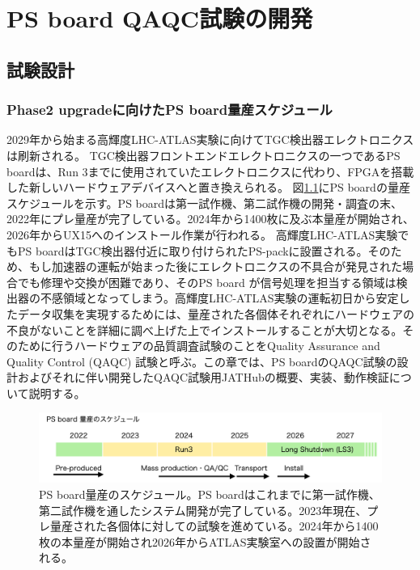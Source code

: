 \chapter{PS board QAQC試験の開発}
\label{chap_QAQC}

\section{試験設計}
\label{sec_QAQCdesign}
\subsection{Phase2 upgradeに向けたPS board量産スケジュール}
\label{subsec_PSBschedule}
2029年から始まる高輝度LHC-ATLAS実験に向けてTGC検出器エレクトロニクスは刷新される。
TGC検出器フロントエンドエレクトロニクスの一つであるPS boardは、Run 3までに使用されていたエレクトロニクスに代わり、FPGAを搭載した新しいハードウェアデバイスへと置き換えられる。
図\ref{PSBschedule}にPS boardの量産スケジュールを示す。PS boardは第一試作機、第二試作機の開発・調査の末、2022年にプレ量産が完了している。2024年から1400枚に及ぶ本量産が開始され、2026年からUX15へのインストール作業が行われる。
高輝度LHC-ATLAS実験でもPS boardはTGC検出器付近に取り付けられたPS-packに設置される。そのため、もし加速器の運転が始まった後にエレクトロニクスの不具合が発見された場合でも修理や交換が困難であり、そのPS board が信号処理を担当する領域は検出器の不感領域となってしまう。高輝度LHC-ATLAS実験の運転初日から安定したデータ収集を実現するためには、量産された各個体それぞれにハードウェアの不良がないことを詳細に調べ上げた上でインストールすることが大切となる。そのために行うハードウェアの品質調査試験のことをQuality Assurance and Quality Control (QAQC) 試験と呼ぶ。この章では、PS boardのQAQC試験の設計およびそれに伴い開発したQAQC試験用JATHubの概要、実装、動作検証について説明する。

\begin{figure} 
\centering
\includegraphics[width=16cm]{fig/QAQC/PSBschedule.png}
\caption[PS board量産のスケジュール]{PS board量産のスケジュール。PS boardはこれまでに第一試作機、第二試作機を通したシステム開発が完了している。2023年現在、プレ量産された各個体に対しての試験を進めている。2024年から1400枚の本量産が開始され2026年からATLAS実験室への設置が開始される。}
\label{PSBschedule}
\end{figure}

